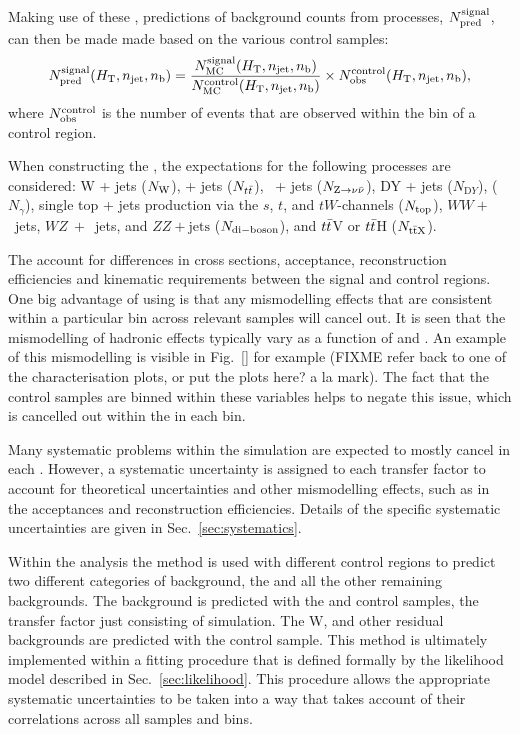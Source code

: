 Making use of these \TFs, predictions of background counts from \SM
processes, $N_{\textrm{pred}}^{\rm signal}$, can then be made made based on the
various control samples:
\begin{equation}
  \label{equ:pred-method}
  N_{\textrm{pred}}^{\rm signal}(\mbox{$H_\text{T}$},n_{\mathrm{jet}},n_{\text{b}}) = \frac{N_{\rm MC}^{\rm
      signal}(\mbox{$H_\text{T}$},n_{\mathrm{jet}},n_{\text{b}})}{N_{\rm MC}^{\rm
      control}(\mbox{$H_\text{T}$},n_{\mathrm{jet}},n_{\text{b}})} \times N_{\textrm{obs}}^{\rm
    control}(\mbox{$H_\text{T}$},n_{\mathrm{jet}},n_{\text{b}}),
\end{equation}
where $N_{\textrm{obs}}^{\rm control}$ is the number of events that are observed
within the bin of a control region.

When constructing the \TFs, the \MC expectations for the following \SM
processes are considered: W + jets ($N_{\rm W}$), \ttbar + jets
($N_{t\bar{t}}$), \znunu\ + jets ($N_{{\text Z} \rightarrow \nu\bar{\nu}}$), DY + jets ($N_{\mathrm
DY}$), \gj ($N_\gamma$), single top + jets production via the $s$,
$t$, and $tW$-channels ($N_{\rm top}$), $WW+$~jets, $WZ~+$~jets, and
$ZZ + \textrm{jets}$ ($N_{\rm di-boson}$), and $t\bar{t}$V or $t\bar{t}$H
($N_{\rm {\ensuremath{t\bar{t}}}X}$). 

The \TFs account for differences in cross sections, acceptance,
reconstruction efficiencies and kinematic requirements between the
signal and control regions. One big advantage of using \TFs is that
any mismodelling effects that are consistent within a particular bin
across relevant \MC samples will cancel out. It is seen that the
mismodelling of hadronic effects typically vary as a function of \HT
and \nj. An example of this mismodelling is visible in Fig.~\ref{} for
example (FIXME refer back to one of the characterisation plots, or put
the plots here? a la mark). The fact that the control samples are
binned within these variables helps to negate this issue, which is
cancelled out within the \TF in each bin.

Many systematic problems within the simulation are expected to mostly
cancel in each \TF. However, a systematic uncertainty is assigned to
each transfer factor to account for theoretical uncertainties and
other mismodelling effects, such as in the acceptances and
reconstruction efficiencies. Details of the specific systematic
uncertainties are given in Sec.~\ref{sec:systematics}.

Within the analysis the \TF method is used with different control
regions to predict two different categories of background, the \znunu
and all the other remaining backgrounds. The \znunu background is
predicted with the \gj and \mmj control samples, the transfer factor
just consisting of \znunu simulation. The W, \ttbar and other residual
backgrounds are predicted with the \mj control sample. This method is
ultimately implemented within a fitting procedure that is defined
formally by the likelihood model described in
Sec.~\ref{sec:likelihood}. This procedure allows the appropriate
systematic uncertainties to be taken into a way that takes account of
their correlations across all samples and bins.

